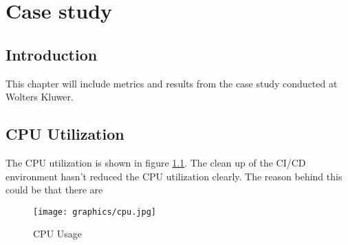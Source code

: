 
\chapter{Case study}%
\label{ch:casestudy}

\section{Introduction}%
\label{sec:introduction-casestudy}
This chapter will include metrics and results from the case study conducted at Wolters Kluwer. 

\section{CPU Utilization}%
\label{sec:cpu-utilization}

The CPU utilization is shown in figure \ref{fig:cpu}. The clean up of the CI/CD environment hasn't reduced the CPU utilization clearly. The reason behind this could be that there are 

\begin{figure}[CPU]
    \centering
    \texttt{[image: graphics/cpu.jpg]}
    \caption{CPU Usage}
    \label{fig:cpu}
\end{figure}

